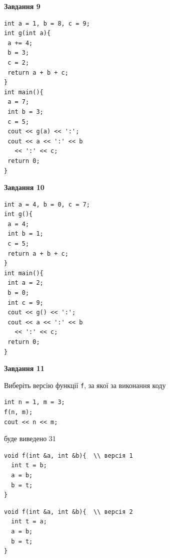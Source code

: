 \documentclass[12pt, ukrainian]{article}
\def\code#1{\Verb!#1!}
\begin{document}
{\begin {large}
\begin{minipage}[t]{11.0cm}
\end{minipage}


\begin{minipage}[t]{7.0cm}

\begin{center}
\textbf{Завдання 9}
\end{center}
\vspace{-8mm}

\begin{verbatim}
int a = 1, b = 8, c = 9;
int g(int a){
 a += 4;
 b = 3;
 c = 2;
 return a + b + c;
}
int main(){
 a = 7;
 int b = 3;
 c = 5;
 cout << g(a) << ':';
 cout << a << ':' << b 
   << ':' << c;
 return 0;
}
\end{verbatim}



\begin{center}
\textbf{Завдання 10}
\end{center}
\vspace{-8mm}

\begin{verbatim}
int a = 4, b = 0, c = 7;
int g(){
 a = 4;
 int b = 1;
 c = 5;
 return a + b + c;
}
int main(){
 int a = 2;
 b = 0;
 int c = 9;
 cout << g() << ':';
 cout << a << ':' << b 
   << ':' << c;
 return 0;
}
\end{verbatim}

\end{minipage}
\vline \hspace{1mm}
\begin{minipage}[t]{11.0cm}

\begin{center}
\textbf{Завдання 11}
\end{center}
Виберіть версію функції \code{f}, за якої за виконання коду
\begin{verbatim}
int n = 1, m = 3;
f(n, m);
cout << n << m;
\end{verbatim}

буде виведено 31

\begin{verbatim}
void f(int &a, int &b){  \\ версія 1
  int t = b;
  a = b;
  b = t;
}
\end{verbatim}

\vspace{-8mm}\begin{verbatim}
void f(int &a, int &b){  \\ версія 2
  int t = a;
  a = b;
  b = t;
}
\end{verbatim}


\end{minipage}
\end{large}}
\end{document}
